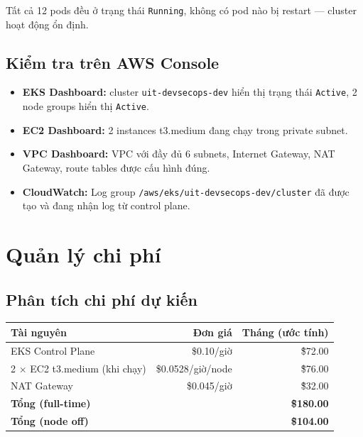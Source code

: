 \documentclass[12pt,a4paper]{article}
\begin{document}
Tất cả 12 pods đều ở trạng thái \texttt{Running}, không có pod nào bị restart — cluster hoạt động ổn định.

\subsection{Kiểm tra trên AWS Console}

\begin{itemize}[leftmargin=*,nosep]
  \item \textbf{EKS Dashboard:} cluster \texttt{uit-devsecops-dev} hiển thị trạng thái \texttt{Active}, 2 node groups hiển thị \texttt{Active}.
  \item \textbf{EC2 Dashboard:} 2 instances t3.medium đang chạy trong private subnet.
  \item \textbf{VPC Dashboard:} VPC với đầy đủ 6 subnets, Internet Gateway, NAT Gateway, route tables được cấu hình đúng.
  \item \textbf{CloudWatch:} Log group \texttt{/aws/eks/uit-devsecops-dev/cluster} đã được tạo và đang nhận log từ control plane.
\end{itemize}

\section{Quản lý chi phí}

\subsection{Phân tích chi phí dự kiến}

\begin{table}[H]
\centering
\begin{tabular}{@{}lrr@{}}
\toprule
\textbf{Tài nguyên}                    & \textbf{Đơn giá}     & \textbf{Tháng (ước tính)} \\
\midrule
EKS Control Plane                      & \$0.10/giờ           & \~\$72.00 \\
2 $\times$ EC2 t3.medium (khi chạy)    & \$0.0528/giờ/node    & \~\$76.00 \\
NAT Gateway                            & \$0.045/giờ          & \~\$32.00 \\
\midrule
\textbf{Tổng (full-time)}              &                      & \textbf{\~\$180.00} \\
\textbf{Tổng (node off)}               &                      & \textbf{\~\$104.00} \\
\bottomrule
\end{tabular}
\end{table}
\end{document}
